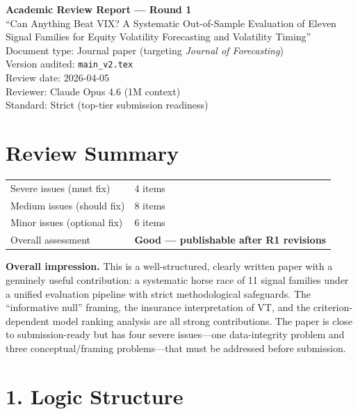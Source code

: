 \documentclass[12pt,a4paper]{article}
\begin{document}
\begin{center}
{\Large\bfseries Academic Review Report --- Round 1}\\[0.5em]
{\large ``Can Anything Beat VIX? A Systematic Out-of-Sample Evaluation of Eleven Signal Families for Equity Volatility Forecasting and Volatility Timing''}\\[0.5em]
{\normalsize Document type: Journal paper (targeting \textit{Journal of Forecasting})}\\
{\normalsize Version audited: \texttt{main\_v2.tex}}\\
{\normalsize Review date: 2026-04-05}\\
{\normalsize Reviewer: Claude Opus 4.6 (1M context)}\\
{\normalsize Standard: Strict (top-tier submission readiness)}
\end{center}

\bigskip

\section*{Review Summary}

\begin{tabular}{ll}
\textcolor{errorred}{Severe issues (must fix)} & 4 items \\
\textcolor{warncolor}{Medium issues (should fix)} & 8 items \\
Minor issues (optional fix) & 6 items \\
Overall assessment & \textbf{Good --- publishable after R1 revisions} \\
\end{tabular}

\bigskip
\noindent
\textbf{Overall impression.}
This is a well-structured, clearly written paper with a genuinely useful contribution: a systematic horse race of 11 signal families under a unified evaluation pipeline with strict methodological safeguards. The ``informative null'' framing, the insurance interpretation of VT, and the criterion-dependent model ranking analysis are all strong contributions. The paper is close to submission-ready but has four severe issues---one data-integrity problem and three conceptual/framing problems---that must be addressed before submission.

\section*{1. Logic Structure}
\end{document}
